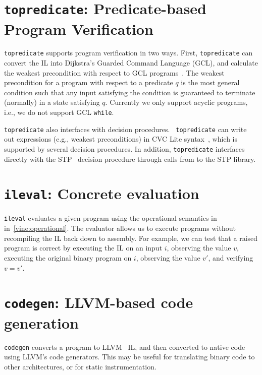 \section{{\tt topredicate}: Predicate-based Program Verification}

{\tt topredicate} supports program verification in two ways. First,
{\tt topredicate} can convert the IL into Dijkstra's Guarded Command
Language (GCL), and calculate the weakest precondition with respect to
GCL programs~\cite{dijkstra:1976}. The weakest precondition for a
program with respect to a predicate $q$ is the most general condition
such that any input satisfying the condition is guaranteed to
terminate (normally) in a state satisfying $q$.  Currently we only
support acyclic programs, i.e., we do not support GCL {\tt while}.

{\tt topredicate} also interfaces with decision procedures.  {\tt
  topredicate} can write out expressions (e.g., weakest preconditions)
in CVC Lite syntax~\cite{cvclite}, which is supported by several
decision procedures. In addition, {\tt topredicate} interfaces
directly with the STP~\cite{ganesh:2007} decision procedure through
calls from \bap to the STP library.

\section{{\tt ileval}: Concrete evaluation} 

{\tt ileval} evaluates a given \bil
program using the operational semantics in in~\ref{vine:operational}.
The evaluator allows us to execute programs without recompiling the IL
back down to assembly. For example, we can test that a raised program
is correct by executing the IL on an input $i$, observing the value $v$,
executing the original binary program on $i$, observing the value
$v'$, and verifying $v = v'$.

\section{\texttt{codegen}: LLVM-based code generation}

\texttt{codegen} converts a \bil program to LLVM~\cite{llvm} IL, and
then converted to native code using LLVM's code generators.  This may
be useful for translating binary code to other architectures, or for
static instrumentation.



